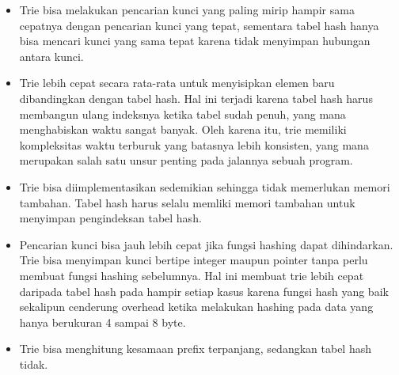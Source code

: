 \begin{itemize}
	\item Trie bisa melakukan pencarian kunci yang paling mirip hampir sama cepatnya dengan pencarian kunci yang tepat, sementara tabel hash hanya bisa mencari kunci yang sama tepat karena tidak menyimpan hubungan antara kunci.
	\item Trie lebih cepat secara rata-rata untuk menyisipkan elemen baru dibandingkan dengan tabel hash. Hal ini terjadi karena tabel hash harus membangun ulang indeksnya ketika tabel sudah penuh, yang mana menghabiskan waktu sangat banyak. Oleh karena itu, trie memiliki kompleksitas waktu terburuk yang batasnya lebih konsisten, yang mana merupakan salah satu unsur penting pada jalannya sebuah program.
	\item Trie bisa diimplementasikan sedemikian sehingga tidak memerlukan memori tambahan. Tabel hash harus selalu memliki memori tambahan untuk menyimpan pengindeksan tabel hash.
	\item Pencarian kunci bisa jauh lebih cepat jika fungsi hashing dapat dihindarkan. Trie bisa menyimpan kunci bertipe integer maupun pointer tanpa perlu membuat fungsi hashing sebelumnya. Hal ini membuat trie lebih cepat daripada tabel hash pada hampir setiap kasus karena fungsi hash yang baik sekalipun cenderung overhead ketika melakukan hashing pada data yang hanya berukuran 4 sampai 8 byte.
	\item Trie bisa menghitung kesamaan prefix terpanjang, sedangkan tabel hash tidak.
\end{itemize}